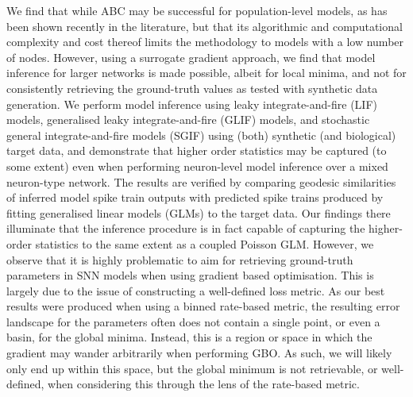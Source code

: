 \documentclass[mphil,deptreport,ianc]{infthesis} %
\begin{document}
We find that while ABC may be successful for population-level models, as has been shown recently in the literature, but that its algorithmic and computational complexity and cost thereof limits the methodology to models with a low number of nodes.
However, using a surrogate gradient approach, we find that model inference for larger networks is made possible, albeit for local minima, and not for consistently retrieving the ground-truth values as tested with synthetic data generation. 
We perform model inference using leaky integrate-and-fire (LIF) models, generalised leaky integrate-and-fire (GLIF) models, and stochastic general integrate-and-fire models (SGIF) using (both) synthetic (and biological) target data, and demonstrate that higher order statistics may be captured (to some extent) even when performing neuron-level model inference over a mixed neuron-type network. The results are verified by comparing geodesic similarities of inferred model spike train outputs with predicted spike trains produced by fitting generalised linear models (GLMs) to the target data.
Our findings there illuminate that the inference procedure is in fact capable of capturing the higher-order statistics to the same extent as a coupled Poisson GLM.
However, we observe that it is highly problematic to aim for retrieving ground-truth parameters in SNN models when using gradient based optimisation. 
This is largely due to the issue of constructing a well-defined loss metric.
As our best results were produced when using a binned rate-based metric, the resulting error landscape for the parameters often does not contain a single point, or even a basin, for the global minima.
Instead, this is a region or space in which the gradient may wander arbitrarily when performing GBO. As such, we will likely only end up within this space, but the global minimum is not retrievable, or well-defined, when considering this through the lens of the rate-based metric.
\end{document}
